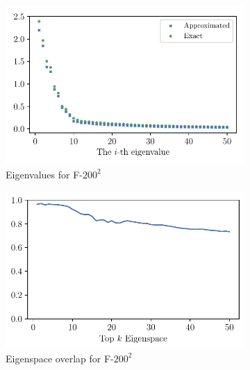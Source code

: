 \begin{figure}[H]
    \centering
    \begin{subfigure}[t]{0.5\textwidth}
        \centering
        \captionsetup{justification=centering}
        \includegraphics[width=\textwidth]{Appendix_Figures/Full_hessian/newplots/eigenval_fc2_200.pdf}
        \caption{Eigenvalues for F-$200^2$}
    \end{subfigure}%
    \begin{subfigure}[t]{0.5\textwidth}
        \centering
        \captionsetup{justification=centering}
        \includegraphics[width=\textwidth]{Appendix_Figures/Full_hessian/newplots/eigenvec_fc2_200.pdf}
        \caption{Eigenspace overlap for F-$200^2$}
    \end{subfigure}\\
    \begin{subfigure}[t]{0.5\textwidth}
        \centering
        \captionsetup{justification=centering}

\end{subfigure}
\end{figure}

